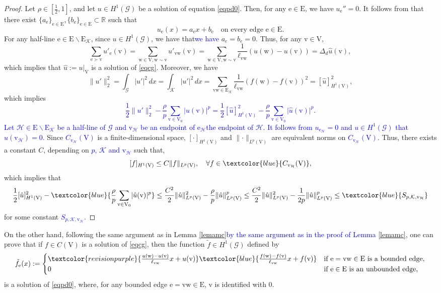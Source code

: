 \documentclass[11pt]{amsart}
\newcommand{\abs}[1]{\lvert#1\rvert}
\newcommand{\norm}[1]{\lVert#1\rVert}
\newcommand{\blue}[1]{\textcolor{blue}{#1}}
\newcommand{\purple}[1]{\textcolor{revisionpurple}{#1}}
\newcommand{\G}{\mathcal{G}}
\newcommand{\K}{\mathcal{K}}
\newcommand{\E}{\mathrm{E}}
\newcommand{\V}{\mathrm{V}}
\newcommand{\R}{\mathbb{R}}
\newcommand{\e}{\mathrm{e}}
\newcommand{\vv}{\mathrm{v}}
\newcommand{\w}{\mathrm{w}}
\numberwithin{equation}{section}
\begin{document}
  \begin{proof}
      Let $\rho \in [\frac{1}{2},1]$, and let $u\in H^1(\G)$ be a solution of equation \eqref{eqpd0}. Then, for any $\e \in \E$, we have $u_{\e}''=0$. It follows from \cite[Remark 4 in Section 3.3]{AD} that there exist $\{a_\e\}_{\e \in \E},\{b_\e\}_{\e \in \E} \subset \R$ such that
      \begin{equation*}
u_{\e}(x)=a_\e x+b_\e\quad \text{on every edge } \e\in \E.
\end{equation*}
For any half-line $\e \in \E\backslash \E_\K$, since $u \in H^1(\G)$, \purple{we have that}\blue{we have} $a_e=b_e=0$.
Thus, for any $\vv \in \V$,
$$
\sum_{\e \succ \vv} u'_\e(\vv)=\sum_{\w\in\V, \w\sim \vv}u'_{\vv\w}(\vv)=\sum_{\w\in\V, \w\sim \vv}\frac{1}{\ell_{\vv\w}}(u(\w)-u(\vv))=\Delta_d \hat{u}(\vv),
$$
which implies that $\hat{u}:=u|_\V$ is a solution of \eqref{eqcg}. Moreover, we have
$$
\norm{u'}^{2}_2=\int_\G\abs{u'}^2\,dx=\int_\K\abs{u'}^2\,dx=\sum_{\vv \w \in \E_\K}\frac{1}{\ell_{\vv\w}}(f(\w)-f(\vv))^2=[\hat{u}]_{H^1(\V)}^2,
$$
which implies 
\blue{$$
\frac{1}{2}\norm{u'}^{2}_2-\frac{\rho}{p}\sum_{\vv \in \V_0}\abs{u(\vv)}^p=\frac{1}{2}[\hat{u}]_{H^1(\V)}^2-\frac{\rho}{p}\sum_{\vv \in \V_0}\abs{\hat{u}(\vv)}^p.
$$}
\blue{Let $\mathcal{H}\in \E\backslash \E_\K$ be a half-line of $\G$ and $\vv_\mathcal{H}$ be \purple{an endpoint of $\e_\mathcal{H}$}\blue{the endpoint of $\mathcal{H}$}. It follows from $u_{\e_\mathcal{H}}=0$ and $u \in H^1(\G)$ that $u(\vv_\mathcal{H})=0$.}  Since \blue{$C_{\vv_\mathcal{H}}(\V)$} is a finite-dimensional space, $[\cdot]_{H^1(\V)}$ and $\norm{\cdot}_{L^p(\V)}$ are equivalent norms on  \blue{$C_{\vv_\mathcal{H}}(\V)$}. 
Thus, there exists a constant $C$, depending on \blue{$p$, $\K$ and $\vv_\mathcal{H}$} such that, 
$$
[f]_{H^1(\V)} \leq C\norm{f}_{L^p(\V)}, \quad \forall f \in  \blue{C_{\vv_\mathcal{H}}(\V)},
$$
which implies that
$$
\frac{1}{2}[\hat{u}]_{H^1(\V)}^2-\blue{\frac{\rho}{p}\sum_{\vv \in \V_0}\abs{\hat{u}(\vv)}^p}\leq \frac{C^2}{2}\norm{\hat{u}}_{L^p(\V)}^2 - \frac{\rho}{p}\norm{\hat{u}}_{L^p(\V)}^p \leq \frac{C^2}{2}\norm{\hat{u}}_{L^p(\V)}^2 - \frac{1}{2p}\norm{\hat{u}}_{L^p(\V)}^p\leq \blue{S_{p,\K,\vv_{\mathcal{H}}}}
$$
for some constant \blue{$S_{p,\K,\vv_{\mathcal{H}}}$}.
  \end{proof}
On the other hand, \purple{following the same argument as in Lemma \ref{lemamc}}\blue{by the same argument as in the proof of Lemma \ref{lemamc}}, one can prove that if $f \in C(\V)$ is a solution of \eqref{eqcg}, then the function $\tilde{f} \in H^1(\G)$ defined by
$$\tilde{f}_\e(x):=\begin{cases}
\purple{\frac{u(\w)-u(\vv)}{\ell_{\vv\w}}x+u(\vv)}\blue{\frac{f(\w)-f(\vv)}{\ell_{\vv\w}}x+f(\vv)} &\text{if }\e=\vv\w \in \E \text{ is a bounded edge},\\
    0 &\text{if }\e \in \E \text{ is an unbounded edge},\\
\end{cases}$$
 is a solution of \eqref{eqpd0}, where, for any bounded edge $\e=\vv\w \in \E$, $\vv$ is identified with $0$.
 
\end{document}
